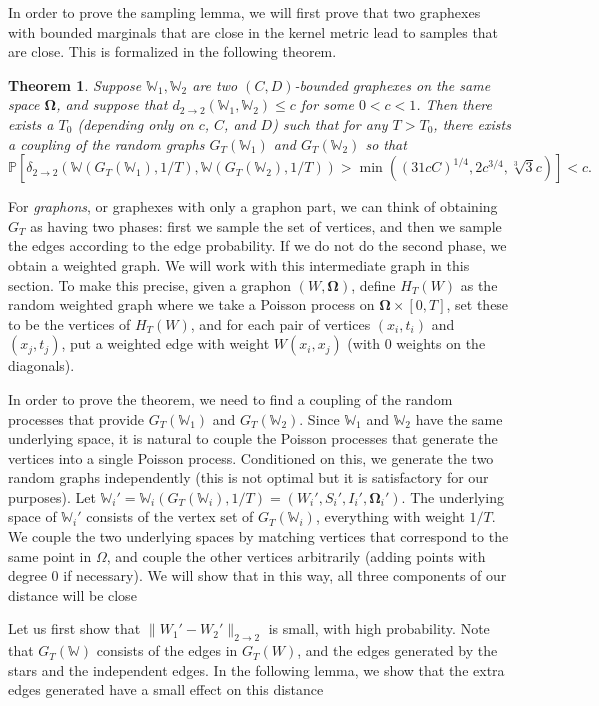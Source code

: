 \documentclass{amsart}
\numberwithin{equation}{section}
\numberwithin{figure}{section}
\newtheorem{theorem}{Theorem}[section]
\theoremstyle{definition}
\theoremstyle{remark}
\newcommand{\bOmega}{{\mathbf{\Omega}}}
\newcommand{\PP}{\mathbb{P}}
\newcommand{\cW}{\mathbb{W}}
\newcommand{\deltt}{\delta_{2\to 2}}
\def\d22{d_{2\to 2}}
\begin{document}
In order to prove the sampling lemma, we will first prove that two graphexes
with bounded marginals that are close in the kernel metric lead to samples
that are close. This is formalized in the following theorem.

\begin{theorem} \label{thm:sampleddistanceclose}
Suppose $\cW_1,\cW_2$ are two $(C,D)$-bounded graphexes on the same space
$\bOmega$, and suppose that $\d22(\cW_1,\cW_2)\leq c$ for some $0<c<1$. Then
there exists a $T_0$ (depending only on $c$, $C$, and $D$) such that for any
$T>T_0$, there exists a coupling of the random graphs $G_T(\cW_1)$ and
$G_T(\cW_2)$ so that
\[\PP\left[\deltt(\cW(G_T(\cW_1),1/T),\cW(G_T(\cW_2),1/T))>
\min\left((31cC)^{1/4}, 2c^{3/4},\sqrt[3]{3}c\right)
\right] < c
.\]
\end{theorem}

For \emph{graphons}, or graphexes with only a graphon part, we can think of
obtaining $G_T$ as having two phases: first we sample the set of vertices,
and then we sample the edges according to the edge probability. If we do not
do the second phase, we obtain a weighted graph. We will work with this
intermediate graph in this section. To make this precise, given a graphon
$(W,\bOmega)$, define $H_T(W)$ as the random weighted graph where we take a
Poisson process on $\bOmega \times [0,T]$, set these to be the vertices of
$H_T(W)$, and for each pair of vertices $(x_i,t_i)$ and $(x_j,t_j)$, put a
weighted edge with weight $W(x_i,x_j)$ (with $0$ weights on the diagonals).

In order to prove the theorem, we need to find a coupling of the random
processes that provide $G_T(\cW_1)$ and $G_T(\cW_2)$. Since $\cW_1$ and
$\cW_2$ have the same underlying space, it is natural to couple the Poisson
processes that generate the vertices into a single Poisson process.
Conditioned on this, we generate the two random graphs independently (this is
not optimal but it is satisfactory for our purposes). Let
$\cW_i'=\cW_i(G_T(\cW_i),1/T)=(W_i',S_i',I_i',\bOmega_i')$. The underlying
space of $\cW_i'$ consists of the vertex set of $G_T(\cW_i)$, everything with
weight $1/T$. We couple the two underlying spaces by matching vertices that
correspond to the same point in $\Omega$, and couple the other vertices
arbitrarily (adding points with degree $0$ if necessary). We will show that
in this way, all three components of our distance will be close

Let us first show that $\|W_1'-W_2'\|_{2 \rightarrow 2}$ is small, with high
probability. Note that $G_T(\cW)$ consists of the edges in $G_T(W)$, and the
edges generated by the stars and the independent edges. In the following
lemma, we show that the extra edges generated have a small effect on this
distance
\end{document}
